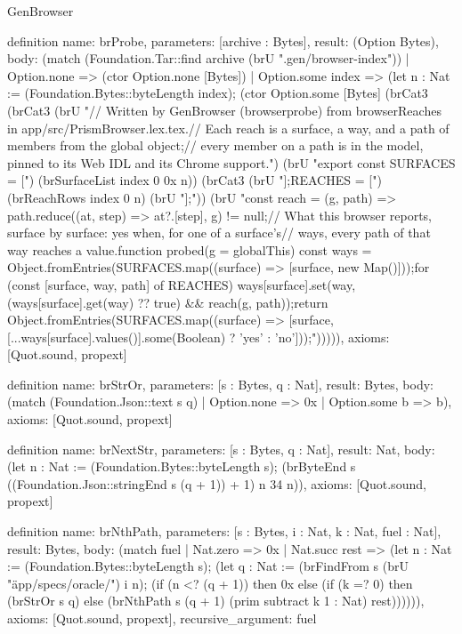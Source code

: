 \begin{lexlean}{GenBrowser}
\begin{semanticmodule}
{{definition{
  name: brProbe,
  parameters: [archive : Bytes],
  result: (Option Bytes),
  body: (match (Foundation.Tar::find archive (brU ".gen/browser-index"))
    | Option.none => (ctor Option.none [Bytes])
    | Option.some index => (let n : Nat := (Foundation.Bytes::byteLength index); (ctor Option.some [Bytes] (brCat3 (brCat3 (brU "// Written by GenBrowser (browserprobe) from browserReaches in app/src/PrismBrowser.lex.tex.\n// Each reach is a surface, a way, and a path of members from the global object;\n// every member on a path is in the model, pinned to its Web IDL and its Chrome support.\n\n") (brU "export const SURFACES = [") (brSurfaceList index 0 0x n)) (brCat3 (brU "];\n\nconst REACHES = [\n") (brReachRows index 0 n) (brU "];\n\n")) (brU "const reach = (g, path) => path.reduce((at, step) => at?.[step], g) != null;\n\n// What this browser reports, surface by surface: yes when, for one of a surface's\n// ways, every path of that way reaches a value.\nexport function probed(g = globalThis) {\n  const ways = Object.fromEntries(SURFACES.map((surface) => [surface, new Map()]));\n  for (const [surface, way, path] of REACHES) ways[surface].set(way, (ways[surface].get(way) ?? true) && reach(g, path));\n  return Object.fromEntries(SURFACES.map((surface) => [surface, [...ways[surface].values()].some(Boolean) ? 'yes' : 'no']));\n}\n"))))),
  axioms: [Quot.sound, propext]
}

definition{
  name: brStrOr,
  parameters: [s : Bytes, q : Nat],
  result: Bytes,
  body: (match (Foundation.Json::text s q) | Option.none => 0x | Option.some b => b),
  axioms: [Quot.sound, propext]
}

definition{
  name: brNextStr,
  parameters: [s : Bytes, q : Nat],
  result: Nat,
  body: (let n : Nat := (Foundation.Bytes::byteLength s); (brByteEnd s ((Foundation.Json::stringEnd s (q + 1)) + 1) n 34 n)),
  axioms: [Quot.sound, propext]
}

definition{
  name: brNthPath,
  parameters: [s : Bytes, i : Nat, k : Nat, fuel : Nat],
  result: Bytes,
  body: (match fuel
    | Nat.zero => 0x
    | Nat.succ rest => (let n : Nat := (Foundation.Bytes::byteLength s); (let q : Nat := (brFindFrom s (brU "\"app/specs/oracle/") i n); (if (n <? (q + 1)) then 0x else (if (k =? 0) then (brStrOr s q) else (brNthPath s (q + 1) (prim subtract k 1 : Nat) rest)))))),
  axioms: [Quot.sound, propext],
  recursive_argument: fuel
}

}}
\end{semanticmodule}
\end{lexlean}
